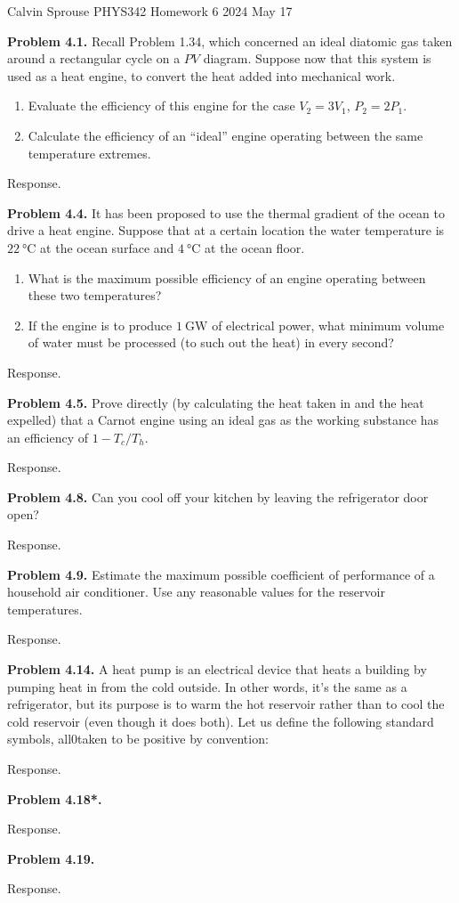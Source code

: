 \documentclass[a4paper, 12pt]{config/homework}
\begin{document}
\noindent
Calvin Sprouse \hfill PHYS342 Homework 6 \hfill 2024 May 17

\bigskip
\noindent
\textbf{Problem 4.1.} Recall Problem 1.34, which concerned an ideal diatomic gas taken around a rectangular cycle on a \(PV\) diagram. Suppose now that this system is used as a heat engine, to convert the heat added into mechanical work.
\begin{enumerate}[label=\textbf{(\alph*)}]
\item Evaluate the efficiency of this engine for the case \(V_2 = 3V_1\), \(P_2 = 2P_1\).
\item Calculate the efficiency of an ``ideal'' engine operating between the same temperature extremes.
\end{enumerate}
\noindent
Response.

\pagebreak
\noindent
\textbf{Problem 4.4.} It has been proposed to use the thermal gradient of the ocean to drive a heat engine. Suppose that at a certain location the water temperature is \(\qty{22}{\celsius}\) at the ocean surface and \(\qty{4}{\celsius}\) at the ocean floor.
\begin{enumerate}[label=\textbf{(\alph*)}]
\item What is the maximum possible efficiency of an engine operating between these two temperatures?
\item If the engine is to produce \(\qty{1}{\giga\watt}\) of electrical power, what minimum volume of water must be processed (to such out the heat) in every second?
\end{enumerate}
\noindent
Response.

\pagebreak
\noindent
\textbf{Problem 4.5.} Prove directly (by calculating the heat taken in and the heat expelled) that a Carnot engine using an ideal gas as the working substance has an efficiency of \(1 - T_c/T_h\).

\noindent
Response.

\pagebreak
\noindent
\textbf{Problem 4.8.} Can you cool off your kitchen by leaving the refrigerator door open?

\noindent
Response.

\pagebreak
\noindent
\textbf{Problem 4.9.} Estimate the maximum possible coefficient of performance of a household air conditioner. Use any reasonable values for the reservoir temperatures.

\noindent
Response.

\pagebreak
\noindent
\textbf{Problem 4.14.} A heat pump is an electrical device that heats a building by pumping heat in from the cold outside. In other words, it's the same as a refrigerator, but its purpose is to warm the hot reservoir rather than to cool the cold reservoir (even though it does both). Let us define the following standard symbols, all0taken to be positive by convention:

\noindent
Response.

\pagebreak
\noindent
\textbf{Problem 4.18*.}

\noindent
Response.

\pagebreak
\noindent
\textbf{Problem 4.19.}

\noindent
Response.
\end{document}
